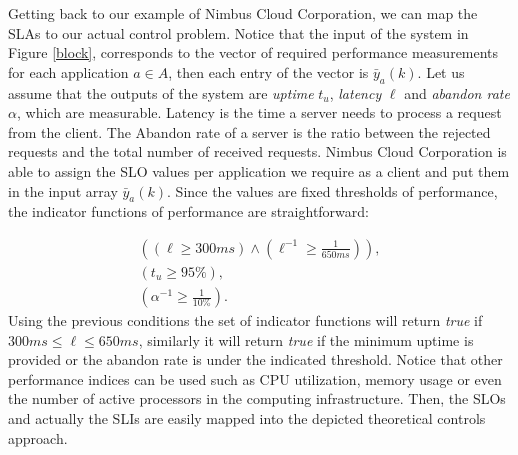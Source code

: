 Getting back to our example of Nimbus Cloud Corporation, we can map the SLAs to our actual control problem. Notice that the input of the system in Figure \ref{block}, corresponds to
the vector of required performance measurements for each application $a \in A$, then each entry of the vector is $\bar{y}_{a}(k)$. Let us assume that the outputs of the system
are \emph{uptime} $t_{u}$, \emph{latency} $\ell$ and \emph{abandon rate} $\alpha$, which are measurable. Latency is the time a server needs 
to process a request from the client. The Abandon rate of a server is the ratio between the rejected requests and the total number of received requests. 
Nimbus Cloud Corporation is able to assign 
the SLO values per application we require as a client and put them in the input array $\bar{y}_{a}(k)$. Since the values are fixed thresholds of performance, the indicator functions of 
performance are straightforward:

\begin{eqnarray}
&\left( (\ell \geq 300 ms) \land (\ell^{-1} \geq \frac{1}{650ms}) \right),& \nonumber \\
&\left(t_{u} \geq 95\%\right),& \nonumber \\
&\left(\alpha^{-1} \geq \frac{1}{10\%}\right).& \nonumber
\end{eqnarray}
Using the previous conditions the set of indicator functions will return \emph{true} if $300ms \leq \ell \leq 650ms$, similarly
 it will return \emph{true} if the minimum uptime is provided or the abandon rate is under the indicated threshold. Notice that other performance indices can be used such as
CPU utilization, memory usage or even the number of active processors in the computing infrastructure. Then, the SLOs and 
actually the SLIs are easily mapped into the depicted theoretical controls approach.